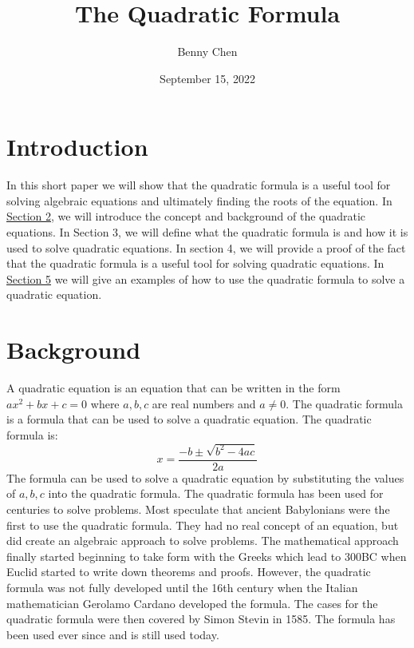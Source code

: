 \documentclass[12pt]{article}
\title{The Quadratic Formula}
\author{Benny Chen}
\date{September 15, 2022}
\begin{document}
\maketitle
 
\section{Introduction}
In this short paper we will show that the quadratic formula is a useful tool for solving algebraic equations and ultimately
finding the roots of the equation. In \hyperref[sec:Background]{Section 2}, we will introduce the concept and background of the quadratic equations. In Section 3, we will define what the quadratic formula is and how it is used to solve quadratic equations. In section 4, we will provide a proof of the fact that the quadratic formula 
is a useful tool for solving quadratic equations. In \hyperref[sec:Examples]{Section 5} we will 
give an examples of how to use the quadratic formula to solve a quadratic equation.

\section{Background}
\label{sec:Background}
A quadratic equation is an equation that can be written in the form $ax^2 + bx + c = 0$ where $a, b, c$ are real numbers and 
$a \neq 0$. The quadratic formula is a formula that can be used to solve a quadratic equation. The quadratic formula is:
\[x = \frac{-b \pm \sqrt{b^2 - 4ac}}{2a}\]
The formula can be used to solve a quadratic equation by substituting the values of
$a, b, c$ into the quadratic formula. The quadratic formula has been used for centuries to solve problems. Most speculate that
ancient Babylonians were the first to use the quadratic formula. They had no real concept of an equation, but did create an 
algebraic approach to solve problems. The mathematical approach finally started beginning to take form with the Greeks which 
lead to 300BC when Euclid started to write down theorems and proofs. However, the quadratic formula was not fully 
developed until the 16th century when the Italian mathematician Gerolamo Cardano developed the formula. The cases for 
the quadratic formula were then covered by Simon Stevin in 1585. The formula has been used ever since and is still used
today. \\\\
\end{document}
